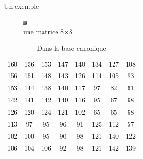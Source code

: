 \documentclass[xcolor=dvipsnames]{beamer}
\begin{document}
\begin{frame}{Un exemple}

    \centering
    \begin{figure}
        \centering
        \includegraphics[width=0.25\linewidth]{bloc_88.png}
        \caption{une matrice 8$\times$8}
    \end{figure}

    \begin{minipage}{0.45\textwidth}
        \centering
        \begin{table}
            \tiny 
            \centering
            \setlength{\tabcolsep}{2pt} %
            \renewcommand{\arraystretch}{1.25} %
            \begin{tabular}{cccccccc}
                160 & 156 & 153 & 147 & 140 & 134 & 127 & 108\\
                156 & 151 & 148 & 143 & 126 & 114 & 105 & 83\\
                153 & 144 & 138 & 140 & 117 & 97 & 82 & 61\\
                142 & 141 & 142 & 149 & 116 & 95 & 67 & 68\\
                126 & 120 & 124 & 121 & 102 & 65 & 65 & 68\\
                113 & 97 & 95 & 96 & 91 & 125 & 112 & 57\\
                102 & 100 & 95 & 90 & 98 & 121 & 140 & 122\\
                106 & 104 & 106 & 92 & 98 & 121 & 142 & 139\\
            \end{tabular}
            \caption{\centering Dans la base canonique}
        \end{table}
    \end{minipage}
    \hfill
    \begin{minipage}{0.45\textwidth}
        \centering
        \begin{table}
            \tiny 
            \centering
            \setlength{\tabcolsep}{2pt} %
            \renewcommand{\arraystretch}{1.25} %


\end{table}
\end{minipage}
\end{frame}
\end{document}
